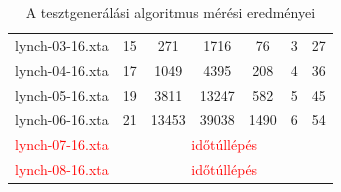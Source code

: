 \begin{table}
\begin{tabular}{ |c||c|c||c|c|c|c| }
lynch-03-16.xta & 15 & 271 & 1716 & 76 & 3 & 27 \\
lynch-04-16.xta & 17 & 1049 & 4395 & 208 & 4 & 36 \\
lynch-05-16.xta & 19 & 3811 & 13247 & 582 & 5 & 45 \\
lynch-06-16.xta & 21 & 13453 & 39038 & 1490 & 6 & 54 \\
\arrayrulecolor{red}\hdashline\arrayrulecolor{black}
\textcolor{red}{lynch-07-16.xta} & \multicolumn{6}{c|}{\textcolor{red}{időtúllépés}} \\
\textcolor{red}{lynch-08-16.xta} & \multicolumn{6}{c|}{\textcolor{red}{időtúllépés}} \\
\hline
\end{tabular}
\caption{A tesztgenerálási algoritmus mérési eredményei}
\label{table:meresek}
\end{table}